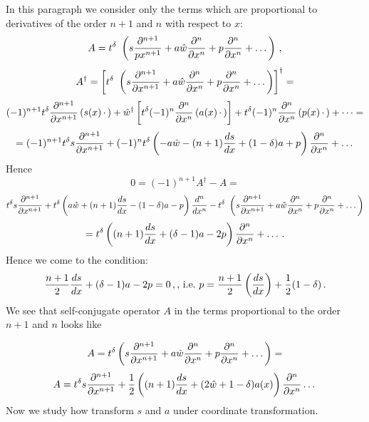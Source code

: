 In this paragraph we consider only the terms which are proportional to derivatives of the order $n+1$ and $n$
 with respect to $x$:
           $$
       A=t^\delta\
          \left(
    s{\partial^{n+1}\over p x^{n+1}}
        +a\hat w {\partial^{n}\over \partial x^{n}}+
    p{\partial^{n}\over \partial x^{n}}
               +
            \dots
          \right)\,,
           $$
             $$
           A^\dagger=
             \left[
            t^\delta\
          \left(
    s{\partial^{n+1}\over \partial x^{n+1}}
        +a\hat w {\partial^{n}\over \partial x^{n}}+
    p{\partial^{n}\over \partial x^{n}}
               +
            \dots
          \right)
          \right]^\dagger=
             $$
        $$
        (-1)^{n+1}
    t^\delta {\partial^{n+1}\over \partial x^{n+1}}
    \left(s(x) \,\cdot\,\right)+
    \hat w^\dagger\left[t^\delta (-1)^n{\partial^{n}\over \partial x^{n}} \left(a(x) \,\cdot\,\right)\right]+
    t^\delta (-1)^n{\partial^{n}\over \partial x^{n}} \left(p(x) \,\cdot\,\right)+\dots=
        $$
        $$
=   (-1)^{n+1}
            t^\delta s{\partial^{n+1}\over \partial x^{n+1}}
    +
            (-1)^nt^\delta
            \left(-a\hat w
            -(n+1) {ds\over dx}
            +(1-\delta) a+
             p\right){\partial^{n}\over \partial x^{n}}
        +\dots
                $$
Hence
                  $$
      0=  (-1)^{n+1}A^\dagger-A=
                   $$
                   $$
       t^\delta s{\partial ^{n+1}\over \partial x^{n+1}}
                  +
            t^\delta
            \left(a\hat w
            +(n+1) {ds\over dx}
            -(1-\delta) a-
             p\right){d^{n}\over dx^{n}}
             -t^\delta\
          \left(
    s{\partial^{n+1}\over \partial x^{n+1}}
        +a\hat w {\partial^{n}\over \partial x^{n}}+
    p{\partial^{n}\over \partial x^{n}}
               +
            \dots
          \right)
                  $$
                  $$
      =t^\delta
            \left((n+1) {ds\over dx}
            +(\delta-1) a-2p
               \right){\partial^{n}\over \partial x^{n}}+\dots\,.
                  $$
Hence we come to the condition:
               $$
               {n+1\over 2}{ds\over dx}
            +(\delta-1) a-2p=0\,,,\,{\rm i.e.}\,\, p={n+1\over 2}\left({ds\over dx}\right)+
{1\over 2}(1-\delta)\,.
               $$
We see that self-conjugate operator $A$ in the terms proportional to the order $n+1$ and $n$ looks like

         $$
       A=t^\delta
          \left(
    s{\partial^{n+1}\over \partial x^{n+1}}
        +a\hat w {\partial^{n}\over \partial x^{n}}+
    p{\partial^{n}\over \partial x^{n}}
               +
            \dots
          \right)=
          $$
          $$
          A=t^\delta
    s{\partial^{n+1}\over \partial x^{n+1}}
        +{1\over 2}
        \left(
        (n+1){ds\over dx}+
        (2\hat w+1-\delta)a(x)
               \right) {\partial^{n}\over \partial x^{n}}
            \dots
          $$
Now we study how transform $s$ and $a$ under coordinate transformation.


